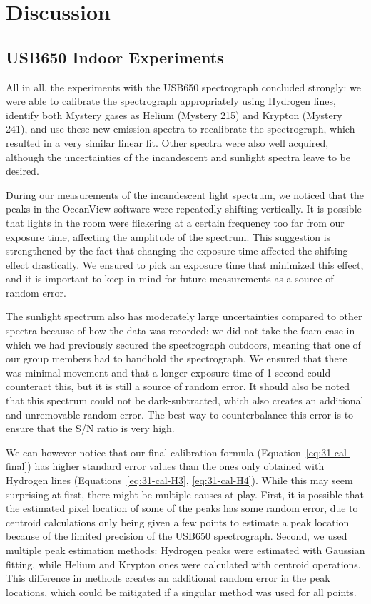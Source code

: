 \documentclass[twocolumn]{aastex702}
\begin{document}
  \section{Discussion}\label{sec:disc}
  
  	\subsection{USB650 Indoor Experiments}\label{ssec:usb650-disc}
  	
  		All in all, the experiments with the USB650 spectrograph concluded strongly: we were able to calibrate the spectrograph appropriately using Hydrogen lines, identify both Mystery gases as Helium (Mystery 215) and Krypton (Mystery 241), and use these new emission spectra to recalibrate the spectrograph, which resulted in a very similar linear fit. Other spectra were also well acquired, although the uncertainties of the incandescent and sunlight spectra leave to be desired.
  		
  		During our measurements of the incandescent light spectrum, we noticed that the peaks in the OceanView software were repeatedly shifting vertically. It is possible that lights in the room were flickering at a certain frequency too far from our exposure time, affecting the amplitude of the spectrum. This suggestion is strengthened by the fact that changing the exposure time affected the shifting effect drastically. We ensured to pick an exposure time that minimized this effect, and it is important to keep in mind for future measurements as a source of random error.
  		
  		The sunlight spectrum also has moderately large uncertainties compared to other spectra because of how the data was recorded: we did not take the foam case in which we had previously secured the spectrograph outdoors, meaning that one of our group members had to handhold the spectrograph. We ensured that there was minimal movement and that a longer exposure time of 1 second could counteract this, but it is still a source of random error. It should also be noted that this spectrum could not be dark-subtracted, which also creates an additional and unremovable random error. The best way to counterbalance this error is to ensure that the S/N ratio is very high.
  		
  		We can however notice that our final calibration formula (Equation~\ref{eq:31-cal-final}) has higher standard error values than the ones only obtained with Hydrogen lines (Equations~\ref{eq:31-cal-H3}, \ref{eq:31-cal-H4}). While this may seem surprising at first, there might be multiple causes at play. First, it is possible that the estimated pixel location of some of the peaks has some random error, due to centroid calculations only being given a few points to estimate a peak location because of the limited precision of the USB650 spectrograph. Second, we used multiple peak estimation methods: Hydrogen peaks were estimated with Gaussian fitting, while Helium and Krypton ones were calculated with centroid operations. This difference in methods creates an additional random error in the peak locations, which could be mitigated if a singular method was used for all points.
  		
\end{document}
